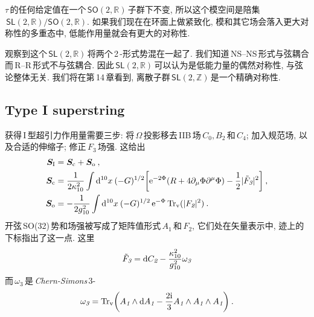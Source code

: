 $\tau\,$的任何给定值在一个$\,\textsf{SO}(2,\mathds{R})\,$子群下不变, 所以这个模空间是陪集$\,\textsf{SL}(2,\mathds{R})/\textsf{SO}(2,\mathds{R})$. 如果我们现在在环面上做紧致化, 模和其它场会落入更大对称性的多重态中, 低能作用量就会有更大的对称性.

观察到这个$\,\textsf{SL}(2,\mathds{R})\,$将两个\,2\,-形式势混在一起了. 我们知道\,NS--NS\,形式与弦耦合而\,R--R\,形式不与弦耦合. 因此$\,\textsf{SL}(2,\mathds{R})\,$可以认为是低能力量的偶然对称性, 与弦论整体无关. 我们将在第\,14\,章看到, 离散子群$\,\textsf{SL}(2,\mathds{Z})\,$是一个精确对称性.


\subsection*{Type I superstring}

获得\,I\,型超引力作用量需要三步: 将$\,\Omega\,$投影移去\,IIB\,场$\,C_{\textit{0}},B_{\textit{2}}\,$和$\,C_{\textit{4}}$; 加入规范场, 以及合适的伸缩子; 修正$\,F_{\textit{3}}\,$场强. 这给出
\begin{subequations}
    \begin{align}
        \bm{S}_{\text{I}} &= \bm{S}_{\text{c}}+\bm{S}_{\text{o}} \:,\label{12.1.34a} \\
        \bm{S}_{\text{c}} &= \frac{1}{2\kappa_{10}^{2}}\int \mathrm{d}^{10}x\:
        (-G)^{1/2}\biggl[\mathrm{e}^{-2\Phi}(R+4\partial_{\mu}\Phi\partial^{\mu}\Phi)-\frac{1}{2}\lvert \tilde{F}_{\textit{3}}\rvert^{2}\biggr] \:,
        \label{12.1.34b} \\
        \bm{S}_{\text{o}} &= -\frac{1}{2g_{10}^{2}} \int\mathrm{d}^{10}x\:(-G)^{1/2}\,\mathrm{e}^{-\Phi}\operatorname{Tr}_{\mathrm{v}}(\lvert F_{\textit{2}}\rvert^{2}) \:. \label{12.1.34c}
    \end{align} \label{12.1.34}
\end{subequations}
开弦\,SO(32)\,势和场强被写成了矩阵值形式$\,A_{\textit{1}}\,$和$\,F_{\textit{2}}$, 它们处在矢量表示中, 迹上的下标指出了这一点. 这里
\begin{equation}
    \tilde{F}_{\textit{3}}=\mathrm{d} C_{\textit{2}} -\frac{\kappa_{10}^{2}}{g_{10}^{2}}\omega_{\textit{3}} \label{12.1.35}
\end{equation}
而$\,\omega_{\textit{3}}\,$是\,\emph{Chern-Simons}\,3-{}
\begin{equation}
    \omega_{\textit{3}}= \operatorname{Tr}_{\mathrm{v}}\biggl(
    A_{\textit{1}}\wedge \mathrm{d} A_{\textit{1}} -\frac{2\mathrm{i}}{3}  A_{\textit{1}}\wedge  A_{\textit{1}}\wedge  A_{\textit{1}}
    \biggr) \:. \label{12.1.36}
\end{equation}
